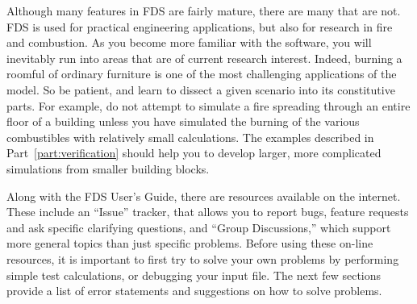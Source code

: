 \documentclass[11pt]{book}
\begin{document}
Although many features in FDS are fairly mature, there are many that are not. FDS is used for
practical engineering applications, but also for research in fire and combustion. As you become
more familiar with the software, you will inevitably run into areas that are of current research
interest. Indeed, burning a roomful of ordinary furniture is one of the most challenging applications
of the model. So be patient, and learn to dissect a given scenario into its constitutive parts.
For example, do not attempt to simulate a fire spreading through an entire floor of a
building unless you have simulated the burning of the various combustibles with relatively small calculations.
The examples described in Part~\ref{part:verification} should help
you to develop larger, more complicated simulations from smaller building blocks.

Along with the FDS User's Guide, there are resources available on the internet.
These include an ``Issue'' tracker, that allows you to report bugs, feature requests and ask specific clarifying questions,
and ``Group Discussions,'' which support more general topics than just specific problems.
Before using these on-line resources, it is important to first try to solve your own
problems by performing simple test calculations, or debugging your input file. The next few sections
provide a list of error statements and suggestions on how to solve problems.
\end{document}
